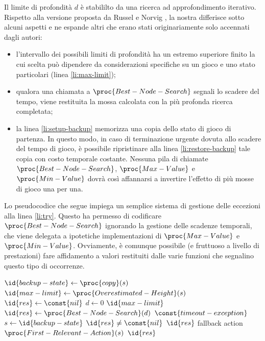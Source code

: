 \documentclass{article}
\begin{document}
Il limite di profondità $d$ è stabililto da una ricerca ad approfondimento
iterativo. Rispetto alla versione proposta da Russel e Norvig
\cite{at.UBO029034619980101.109--111}, la nostra differisce sotto alcuni aspetti
e ne espande altri che erano stati originariamente solo accennati dagli autori:
\begin{itemize}
    \item l'intervallo dei possibili limiti di profondità ha un estremo
      superiore finito la cui scelta può dipendere da considerazioni specifiche
      su un gioco e uno stato particolari (linea \ref{li:max-limit});
    \item qualora una chiamata a $\proc{Best-Node-Search}$ segnali lo scadere
      del tempo, viene restituita la mossa calcolata con la più profonda ricerca
      completata;
    \item la linea \ref{li:setup-backup} memorizza una copia dello stato di
      gioco di partenza. In questo modo, in caso di terminazione urgente dovuta
      allo scadere del tempo di gioco, è possibile ripristinare alla linea
      \ref{li:restore-backup} tale copia con costo temporale costante. Nessuna
      pila di chiamate $\proc{Best-Node-Search}$, $\proc{Max-Value}$ e
      $\proc{Min-Value}$ dovrà così affannarsi a invertire l'effetto di più
      mosse di gioco una per una.
\end{itemize}
\begin{sloppypar}
Lo pseudocodice che segue impiega un semplice sistema di gestione delle
eccezioni alla linea \ref{li:try}. Questo ha permesso di codificare
$\proc{Best-Node-Search}$ ignorando la gestione delle scadenze temporali, che
viene delegata a ipotetiche implementazioni di $\proc{Max-Value}$ e
$\proc{Min-Value}$. Ovviamente, è comunque possibile (e fruttuoso a livello di
prestazioni) fare affidamento a valori restituiti dalle varie funzioni che
segnalino questo tipo di occorrenze.
\end{sloppypar}

\begin{codebox}
  \li  $\id{backup-state} \gets \proc{copy}(s)$ \label{li:setup-backup}
  \li  $\id{max-limit} \gets \proc{Overestimated-Height}(s)$
       \label{li:max-limit}
  \li  $\id{res} \gets \const{nil}$
  \li  \For $d \gets 0$ \To $\id{max-limit}$
  \li    \Do
            \label{li:try}
  \li        \Do
               $\id{res} \gets \proc{Best-Node-Search}(d)$
             \End
  \li      {} $\const{timeout-exception}$
  \li        \Do
               $s \gets \id{backup-state}$ \label{li:restore-backup}
  \li          \If $\id{res} \neq \const{nil}$
  \li            \Then
                   \Return $\id{res}$
                 \End
  \li          \Comment fallback action
  \li          \Return $\proc{First-Relevant-Action}(s)$
             \End
         \End
  \li  \Return $\id{res}$
\end{codebox}
\end{document}
